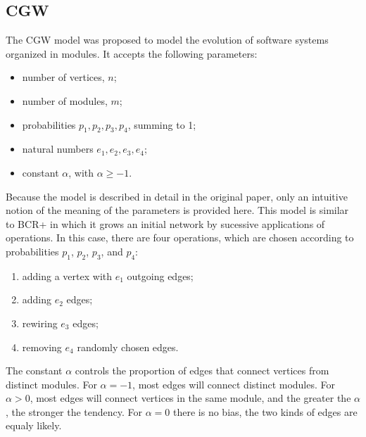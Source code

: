 
\subsection{CGW}

The CGW model \cite{Chen2008} was proposed to model the evolution of software
systems organized in modules. It accepts the following parameters:

\begin{itemize}
\item number of vertices, $n$;
\item number of modules, $m$;
\item probabilities $p_1, p_2, p_3, p_4$, summing to 1;
\item natural numbers $e_1, e_2, e_3, e_4$;
\item constant $\alpha$, with $\alpha \ge -1$.
\end{itemize}

Because the model is described in detail in the original paper, only an
intuitive notion of the meaning of the parameters is provided here. This model
is similar to BCR+ in which it grows an initial network by sucessive
applications of operations. In this case, there are four operations, which are
chosen according to probabilities $p_1$, $p_2$, $p_3$, and $p_4$: 

\begin{enumerate}
\item adding a vertex with $e_1$ outgoing edges; 
\item adding $e_2$ edges;
\item rewiring $e_3$ edges;
\item removing $e_4$ randomly chosen edges.
\end{enumerate}

The constant $\alpha$ controls the proportion of edges that connect vertices
from distinct modules. For $\alpha = -1$, most edges will connect distinct
modules. For $\alpha > 0$, most edges will connect vertices in the same module,
and the greater the $\alpha$, the stronger the tendency. For $\alpha = 0$ there
is no bias, the two kinds of edges are equaly likely.



